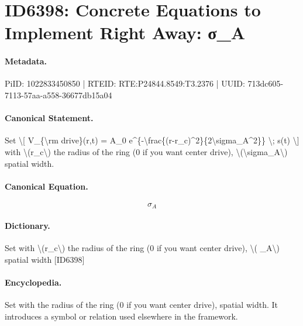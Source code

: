 \section*{ID6398: Concrete Equations to Implement Right Away: σ\_A}
\paragraph{Metadata.}
PiID: 1022833450850 | RTEID: RTE:P24844.8549:T3.2376 | UUID: 713dc605-7113-57aa-a558-36677db15a04

\paragraph{Canonical Statement.}
Set \textbackslash{}[ V\_\{\textbackslash{}rm drive\}(r,t) = A\_0 e\textasciicircum{}\{-\textbackslash{}frac\{(r-r\_c)\textasciicircum{}2\}\{2\textbackslash{}sigma\_A\textasciicircum{}2\}\} \textbackslash{}; s(t) \textbackslash{}] with \textbackslash{}(r\_c\textbackslash{}) the radius of the ring (0 if you want center drive), \textbackslash{}(\textbackslash{}sigma\_A\textbackslash{}) spatial width.

\paragraph{Canonical Equation.}
\[
\sigma_A
\]

\paragraph{Dictionary.}
Set with \textbackslash{}(r\_c\textbackslash{}) the radius of the ring (0 if you want center drive), \textbackslash{}( \_A\textbackslash{}) spatial width [ID6398]

\paragraph{Encyclopedia.}
Set with the radius of the ring (0 if you want center drive), spatial width. It introduces a symbol or relation used elsewhere in the framework.
